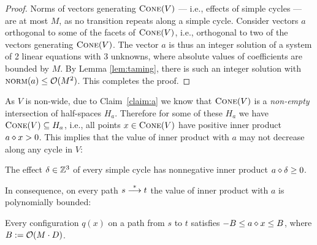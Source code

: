 \begin{proof}
Norms of vectors generating $\textsc{Cone}(V)$ --- i.e., effects of simple cycles --- are at most $M$, 
as no transition repeats along a simple cycle.
Consider vectors $a$ orthogonal to some of the facets of $\textsc{Cone}(V)$, i.e.,
orthogonal to two of the vectors generating $\textsc{Cone}(V)$. 
The vector $a$ is thus an integer solution of a system of 2 linear equations with 3 unknowns,
where absolute values of coefficients are bounded by $M$.
By Lemma \ref{lem:taming}, there is such an integer solution with $\textsc{norm}(a)\leq {\cal O}(M^2)$.
This completes the proof.
\end{proof}

As $V$ is non-wide, 
due to Claim~\ref{claim:a} we know that $\textsc{Cone}(V)$ is a \emph{non-empty} intersection of half-spaces $H_a$.
Therefore for some of these $H_a$ we have
$\textsc{Cone}(V) \subseteq H_a$, i.e.,
%
%
all points $x\in\textsc{Cone}(V)$ have positive inner product $a \diamond x > 0$.
%
This implies that
the value of  inner product with $a$ may not decrease along any cycle in $V$:
%
\begin{claim}\label{clm:inner_with_effect}
The effect $\delta\in\mathbb{Z}^3$ of every simple cycle has nonnegative inner product $a \diamond \delta \geq 0$.
\end{claim}
%
In consequence, on every path $s \stackrel{*}{\longrightarrow} t$ the value of inner product with $a$ is polynomially
bounded:
%
\begin{claim} \label{claim:ax}
Every configuration $q(x)$ on a path from $s$ to $t$ satisfies
$-B \leq a \diamond x \leq B$, where $B := {\cal O}(M\cdot D)$. 
\end{claim}
%
